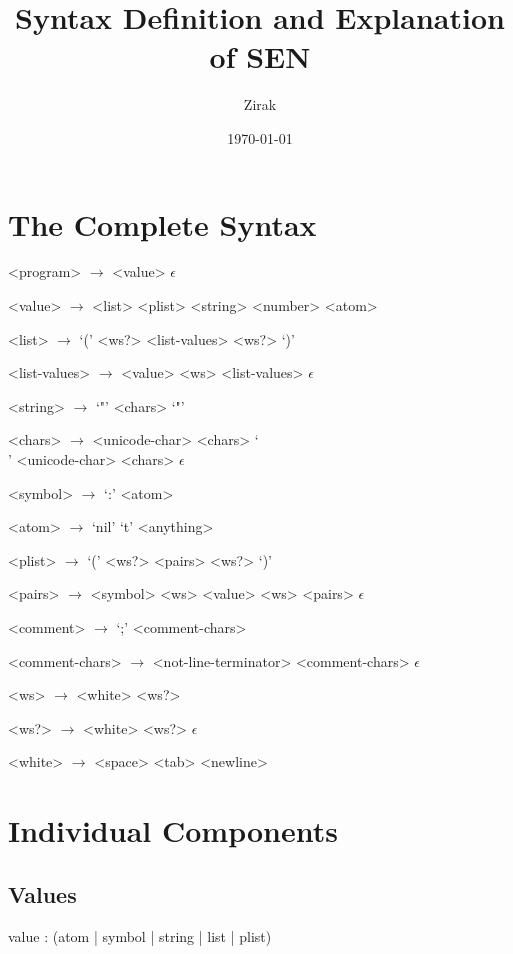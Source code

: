 \documentclass[a4paper]{article}
\begin{document}
\title{Syntax Definition and Explanation of SEN}
\author{Zirak}
\date{\today}

\maketitle

\tableofcontents

\section{The Complete Syntax}

\begin{grammar}
	<program> $\to$ <value>
		\alt $\epsilon$

	<value> $\to$ <list>
		\alt <plist>
		\alt <string>
		\alt <number>
		
	<list> $\to$ `(' <ws?> <list-values> <ws?> `)'

	<list-values> $\to$ <value> <ws> <list-values>
		\alt $\epsilon$
		
	<string> $\to$ `"' <chars> `"'

	<chars> $\to$ <unicode-char> <chars>
		\alt `\\' <unicode-char> <chars>
		\alt $\epsilon$

	<symbol> $\to$ `:' <atom>
	
	<atom> $\to$ `nil'
		\alt `t'
		\alt <anything>

	<plist> $\to$ `(' <ws?> <pairs> <ws?> `)'

	<pairs> $\to$ <symbol> <ws> <value> <ws> <pairs>
		\alt $\epsilon$

	<comment> $\to$ `;' <comment-chars>

	<comment-chars> $\to$ <not-line-terminator> <comment-chars>
		\alt $\epsilon$
		
	<ws> $\to$ <white> <ws?>
	
	<ws?> $\to$ <white> <ws?>
		\alt $\epsilon$
		
	<white> $\to$ <space>
		\alt <form-feed>
		\alt <newline>
		\alt <carriage-return>
\end{grammar}

\section{Individual Components}

\subsection{Values}
\begin{rail}
	value : (atom | symbol | string | list | plist)
\end{rail}
\end{document}
